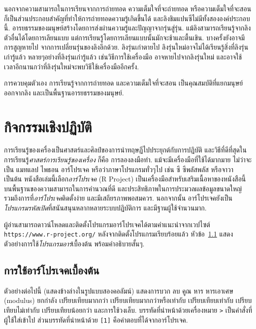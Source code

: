 {\begin{shaded}
นอกจากความสามารถในการเรียนจากการถ่ายทอด
ความเต็มใจที่จะถ่ายทอด หรือความเต็มใจที่จะสอน ก็เป็นส่วนประกอบสำคัญที่ทำให้การถ่ายทอดความรู้เกิดขึ้นได้
และลิงชิมแปนซีไม่มีทั้งสององค์ประกอบนี้.
อารยธรรมของมนุษย์สร้างโดยการส่งผ่านความรู้และปัญญาจากรุ่นสู่รุ่น.
แม้ลิงสามารถเรียนรู้จากลิงตัวอื่นได้โดยการเลียนแบบ
แต่การเรียนรู้โดยการเลียนแบบนั้นมักจะช้าและตื้นเขิน.
บางครั้งยังอาจมีการสูญหายไป จากการเปลี่ยนรุ่นของลิงอีกด้วย.
ลิงรุ่นเก่าตายไป ลิงรุ่นใหม่อาจไม่ได้เรียนรู้สิ่งที่ลิงรุ่นเก่ารู้แล้ว
หลายๆอย่างที่ลิงรุ่นเก่ารู้แล้ว เช่นวิธีการใช้เครื่องมือ อาจหายไปจากลิงรุ่นใหม่
และอาจใช้เวลาอีกนานกว่าที่ลิงรุ่นใหม่จะพบวิธีใช้เครื่องมืออีกครั้ง.

การควบคุมตัวเอง การเรียนรู้จากการถ่ายทอด และความเต็มใจที่จะสอน เป็นคุณสมบัติที่แยกมนุษย์ออกจากลิง 
และเป็นพื้นฐานอารยธรรมของมนุษย์.
\end{shaded}
}


\section{กิจกรรมเชิงปฏิบัติ}
การเรียนรู้ของเครื่องเป็นศาสตร์และศิลป์ของการนำทฤษฏีไปประยุกต์กับการปฏิบัติ 
และวิธีที่ดีที่สุดในการเรียนรู้\textit{ศาสตร์การเรียนรู้ของเครื่อง} ก็คือ การลองลงมือทำ.
แม้จะมีเครื่องมือที่ใช้ได้มากมาย ไม่ว่าจะเป็น แมทแลป ไพธอน อาร์โปรเจค
หรือว่าภาษาโปรแกรมทั่วๆไป เช่น 
ซี ซีพลัสพลัส หรือจาวา เป็นต้น
หนังสือเล่มนี้เลือก\textit{อาร์โปรเจค} (R Project) เป็นเครื่องมือสำหรับเสริมเนื้อหาของหนังสือนี้
บนพื้นฐานของความสามารถในการคำนวณที่ดี และประสิทธิภาพในการประมวลผลข้อมูลขนาดใหญ่  รวมถึงการที่\textit{อาร์โปรเจค}ติดตั้งง่าย และมีเสถียรภาพพอสมควร. 
นอกจากนั้น อาร์โปรเจคยังเป็น\textit{โปรแกรมรหัสเปิด}ที่สนันสนุนหลากหลายระบบปฏิบัติการ และมีฐานผู้ใช้จำนวนมาก.

ผู้อ่านสามารถดาวน์โหลดและติดตั้งโปรแกรมอาร์โปรเจคได้ตามคำแนะนำจากเวปไซต์ \verb|https://www.r-project.org/|
หลังจากติดตั้งโปรแกรมเรียบร้อยแล้ว 
หัวข้อ~\ref{sec: basic R examples} แสดงตัวอย่างการใช้\textit{โปรแกรมอาร์}เบื้องต้น พร้อมคำอธิบายสั้นๆ.

\subsection{การใช้อาร์โปรเจคเบื้องต้น}
\label{sec: basic R examples}
ตัวอย่างต่อไปนี้ (แสดงข้างล่างในรูปแบบสองคอลัมน์) แสดงการบวก ลบ คูณ หาร หารเอาเศษ (modulus) ยกกำลัง เปรียบเทียบมากกว่า เปรียบเทียบมากกว่าหรือเท่ากับ เปรียบเทียบเท่ากับ เปรียบเทียบไม่เท่ากับ เปรียบเทียบน้อยกว่า และการใช้วงเล็บ.
บรรทัดที่นำหน้าด้วยเครื่องหมาย \verb|>| เป็นคำสั่งที่ผู้ใช้ใส่เข้าไป ส่วนบรรทัดที่นำหน้าด้วย \verb|[1]| คือคำตอบที่ได้จากอาร์โปรเจค.

